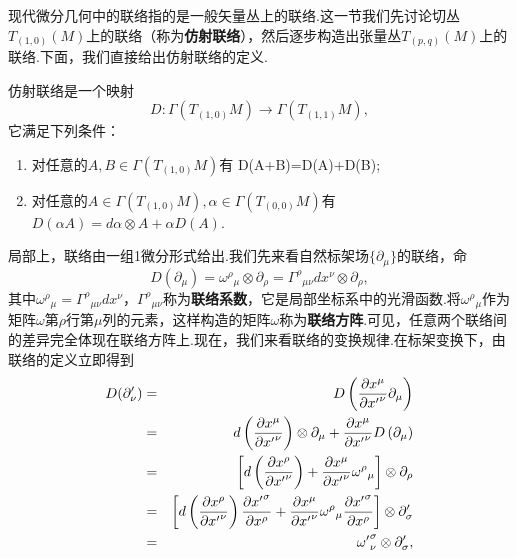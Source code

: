 		现代微分几何中的联络指的是一般矢量丛上的联络.这一节我们先讨论切丛$T_{(1,0)}(M)$上的联络（称为\textbf{仿射联络}），然后逐步构造出张量丛$T_{(p,q)}(M)$上的联络.下面，我们直接给出仿射联络的定义.
		\begin{definition}
			仿射联络是一个映射
			\begin{equation*}
				D:\varGamma(T_{(1,0)}M)\rightarrow \varGamma(T_{(1,1)}M),
			\end{equation*}
			它满足下列条件：
			\begin{enumerate}
				\item 对任意的$A,B\in \varGamma(T_{(1,0)}M)$有 D(A+B)=D(A)+D(B);						
				\item 对任意的$A\in \varGamma(T_{(1,0)}M),\alpha\in \varGamma(T_{(0,0)}M)$有$D(\alpha A)=d\alpha\otimes A+\alpha D(A)$.
			\end{enumerate}
		\end{definition}
		局部上，联络由一组1微分形式给出.我们先来看自然标架场$\{\partial_\mu\}$的联络，命
		\begin{equation}
		D(\partial_\mu)={\omega^\rho}_\mu \otimes\partial_\rho={\varGamma^\rho}_{\mu\nu}dx^\nu\otimes \partial_\rho,
		\end{equation} 
		其中${\omega^\rho}_\mu={\varGamma^\rho}_{\mu\nu}dx^\nu$，${\varGamma^\rho}_{\mu\nu}$称为\textbf{联络系数}，它是局部坐标系中的光滑函数.将${\omega^\rho}_\mu$作为矩阵$\omega$第$\rho$行第$\mu$列的元素，这样构造的矩阵$\omega$称为\textbf{联络方阵}.可见，任意两个联络间的差异完全体现在联络方阵上.现在，我们来看联络的变换规律.在标架变换下，由联络的定义立即得到
		\begin{eqnarray}
			D(\partial'_\nu)&=&D\left(\frac{\partial{x^\mu}}{\partial{x'}^\nu}{\partial}_\mu\right)\notag\\
			&=&d\left(\frac{\partial{x^\mu}}{\partial{x'}^\nu}\right)\otimes{\partial}_\mu+\frac{\partial{x^\mu}}{\partial{x'}^\nu}D\left({\partial}_\mu\right)\notag\\
			&=&\left[d\left(\frac{\partial{x^\rho}}{\partial{x'}^\nu}\right)+\frac{\partial{x^\mu}}{\partial{x'}^\nu}{\omega^\rho}_\mu\right]\otimes{\partial}_\rho\notag\\
			&=&\left[d\left(\frac{\partial{x^\rho}}{\partial{x'}^\nu}\right)\frac{\partial{{x'}^\sigma}}{\partial{x^\rho}}+\frac{\partial{x^\mu}}{\partial{x'}^\nu}{\omega^\rho}_\mu\frac{\partial{{x'}^\sigma}}{\partial{x^\rho}}\right]\otimes\partial'_\sigma\notag\\
			&=&{\omega'}^\sigma_\nu\otimes\partial'_\sigma,
		\end{eqnarray}
